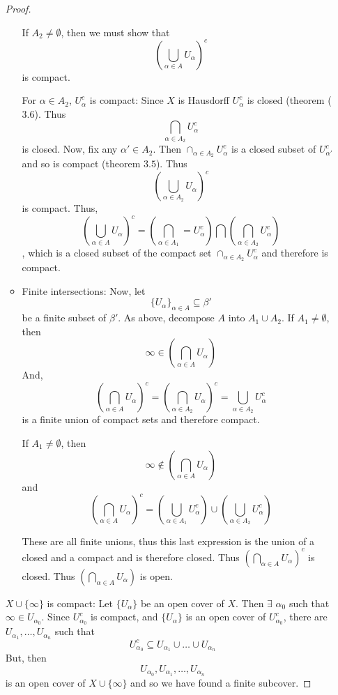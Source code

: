 \documentclass{book}
\begin{document}
\begin{enumerate}[(1)]
\begin{proof}
\begin{itemize}
                    If $A_2\not=\emptyset$, then we must show that 
                    \[\left(\bigcup_{\alpha\in A} U_\alpha\right)^c\] is compact.  
                    \par For $\alpha\in A_2$, $U_{\alpha}^c$ is compact: Since $X$ is Hausdorff $U_{\alpha}^c$ is closed (theorem ($3.6$). Thus 
                    \[\bigcap_{\alpha\in A_2}U_\alpha^c\] is closed.  Now, fix any $\alpha'\in A_2$.  Then $\cap_{\alpha\in A_2}U_\alpha^c$ is a closed subset of $U_{\alpha'}^c$ and so is compact (theorem $3.5$).  Thus \[\left(\bigcup_{\alpha\in A_2}U_\alpha\right)^c\] is compact.  Thus,
                    \[\left(\bigcup_{\alpha\in A}U_\alpha\right)^c = \left(\bigcap_{\alpha\in A_1} =  U_\alpha^c\right)\bigcap\left(\bigcap_{\alpha\in A_2} U_\alpha^c\right)\], which is a closed subset of the compact set $\cap_{\alpha\in A_2} U_\alpha^c$ and therefore is compact.

                \item Finite intersections: Now, let 
                    \[\{U_\alpha\}_{\alpha\in A}\subseteq\beta'\] be a finite subset of $\beta'$. As above, decompose $A$ into $A_1\cup A_2$.  If $A_1 \neq \emptyset$, then 
                    \[\infty\in\left(\bigcap_{\alpha\in A}U_\alpha\right)\] And, 
                    \[\left(\bigcap_{\alpha\in A} U_\alpha\right)^c=\left(\bigcap_{\alpha\in A_2}U_\alpha\right)^c=\bigcup_{\alpha\in A_2}U_\alpha^c\] is a finite union of compact sets and therefore compact.  
                    \par If $A_1 \neq \emptyset$, then 
                    \[ \infty\not\in\left(\bigcap_{\alpha\in A}U_\alpha\right)\]  and 
                    \[\left(\bigcap_{\alpha\in A}U_\alpha\right)^c = \left(\bigcup_{\alpha\in A_1} U_\alpha^c\right) \cup \left(\bigcup_{\alpha\in A_2}U_\alpha^c\right)\]
                    \par These are all finite unions, thus this last expression is the union of a closed and a compact and is therefore closed.  Thus $\left(\bigcap_{\alpha\in A}U_\alpha\right)^c$ is closed.  Thus $\left(\bigcap_{\alpha\in A}U_\alpha\right)$ is open.
            \end{itemize}

            \par $X \cup \{\infty\}$ is compact: Let $\{U_\alpha\}$ be an open cover of $X$.  Then $\exists$ $\alpha_0$ such that $\infty\in U_{\alpha_0}$.  Since $U_{\alpha_0}^c$ is compact, and $\{U_\alpha\}$ is an open cover of $U_{\alpha_0}^c$, there are $U_{\alpha_1},\dots,U_{\alpha_n}$ such that 
            \[U_{\alpha_0}^c\subseteq U_{\alpha_1}\cup\dots\cup U_{\alpha_n}\]
            But, then 
            \[U_{\alpha_0},U_{\alpha_1},\dots,U_{\alpha_n}\] 
            is an open cover of $X\cup\{\infty\}$ and so we have found a finite subcover.


\end{proof}
\end{enumerate}
\end{document}

